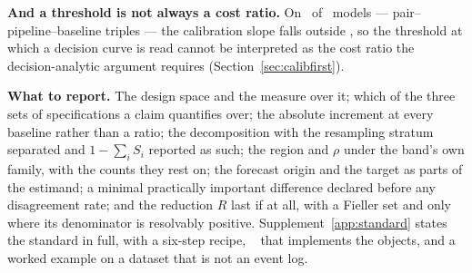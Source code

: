 \textbf{And a threshold is not always a cost ratio.} On \nModelsDcaExcluded\
of \nModelsDca\ models --- pair--pipeline--baseline triples --- the
calibration slope falls outside \calSlopeWindow, so the threshold at which a
decision curve is read cannot be interpreted as the cost ratio the
decision-analytic argument requires (Section~\ref{sec:calibfirst}).

\textbf{What to report.} The design space and the measure over it; which of
the three sets of specifications a claim quantifies over; the absolute
increment at every baseline rather than a ratio; the decomposition with the
resampling stratum separated and $1 - \sum_i S_i$ reported as such; the region
and $\rho$ under the band's own family, with the counts they rest on; the
forecast origin and the target as parts of the estimand; a minimal
practically important difference declared before any disagreement rate; and
the reduction $R$ last if at all, with a Fieller set and only where its
denominator is resolvably positive. Supplement~\ref{app:standard} states the
standard in full, with a six-step recipe, \pkgname\ \citep{fieldvalue} that
implements the objects, and a worked example on a dataset that is not an
event log.
